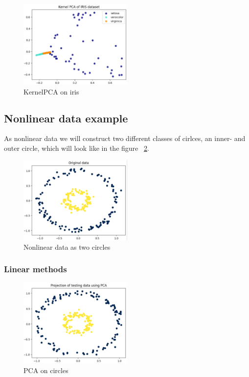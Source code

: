 \begin{figure}[h]
    \centering
    \includegraphics[width=0.5\textwidth]{figures/theory-example-figures/iris-kernelpca.png}
    \caption{KernelPCA on iris}
    \label{fig:iris-kernelpca}
    \end{figure}

\subsection{Nonlinear data example}\label{subsec:nonlinear-data-example}
As nonlinear data we will construct two different classes of cirlces, an inner- and outer circle, which will look like in the figure ~\ref{fig:circles}.

\begin{figure}[h]
    \centering
    \includegraphics[width=0.5\textwidth]{figures/theory-example-figures/fig-circles.png}
    \caption{Nonlinear data as two circles}
    \label{fig:circles}
    \end{figure}

\subsubsection{Linear methods}\label{subsubsec:linear-methods-on-circles}
\begin{figure}[h]
    \centering
    \includegraphics[width=0.5\textwidth]{figures/theory-example-figures/circles-pca.png}
    \caption{PCA on circles}
    \label{fig:circles-pca}
\end{figure}


